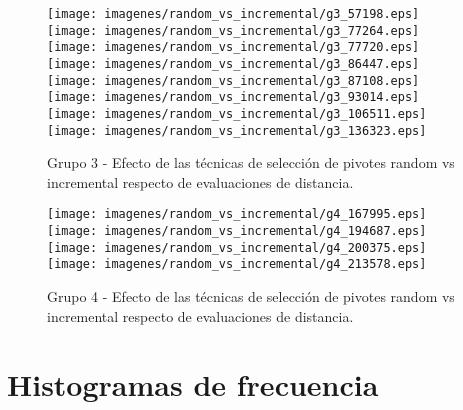 \begin{figure}[h!]
\centering
{\texttt{[image: imagenes/random\_vs\_incremental/g3\_57198.eps]}}
{\texttt{[image: imagenes/random\_vs\_incremental/g3\_77264.eps]}}
{\texttt{[image: imagenes/random\_vs\_incremental/g3\_77720.eps]}}
{\texttt{[image: imagenes/random\_vs\_incremental/g3\_86447.eps]}}
{\texttt{[image: imagenes/random\_vs\_incremental/g3\_87108.eps]}}
{\texttt{[image: imagenes/random\_vs\_incremental/g3\_93014.eps]}}
{\texttt{[image: imagenes/random\_vs\_incremental/g3\_106511.eps]}}
{\texttt{[image: imagenes/random\_vs\_incremental/g3\_136323.eps]}}
\caption{\small Grupo 3 - Efecto de las t\'ecnicas de selecci\'on de pivotes random vs incremental respecto de evaluaciones de distancia.}
\end{figure}

\begin{figure}[h!]
\centering
{\texttt{[image: imagenes/random\_vs\_incremental/g4\_167995.eps]}}
{\texttt{[image: imagenes/random\_vs\_incremental/g4\_194687.eps]}}
{\texttt{[image: imagenes/random\_vs\_incremental/g4\_200375.eps]}}
{\texttt{[image: imagenes/random\_vs\_incremental/g4\_213578.eps]}}
\caption{\small Grupo 4 - Efecto de las t\'ecnicas de selecci\'on de pivotes random vs incremental respecto de evaluaciones de distancia.}
\end{figure}
\chapter{Histogramas de frecuencia}

